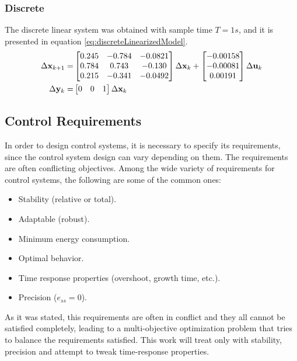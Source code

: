  \subsubsection{Discrete}
 The discrete linear system was obtained with sample time $T=1s$, and it is presented in equation \ref{eq:discreteLinearizedModel}.
 \begin{equation}\label{eq:discreteLinearizedModel}
\begin{split}
    \Delta\mathbf{x}_{k+1} =& \begin{bmatrix}
0.245 & -0.784 & -0.0821\\
0.784 &0.743 & -0.130\\
0.215 & -0.341 & -0.0492
\end{bmatrix} \Delta\mathbf{x}_k+\begin{bmatrix}
-0.00158\\
-0.00081\\
 0.00191
\end{bmatrix}\Delta\mathbf{u}_k\\\vspace{5mm}
    \Delta\mathbf{y}_k=&\begin{bmatrix}
0 & 0 & 1
\end{bmatrix}\Delta\mathbf{x}_k
\end{split}
\end{equation}
 
\subsection{Control Requirements}
In order to design control systems, it is necessary to specify its requirements, since the control system design can vary depending on them. The requirements are often conflicting objectives. Among the wide variety of requirements for control systems, the following are some of the common ones:
\begin{itemize}
    \item Stability (relative or total).
    \item Adaptable (robust).
    \item Minimum energy consumption.
    \item Optimal behavior.
    \item Time response properties (overshoot, growth time, etc.).
    \item Precision ($e_{ss}=0$).
\end{itemize}
As it was stated, this requirements are often in conflict and they all cannot be satisfied completely, leading to a multi-objective optimization problem that tries to balance the requirements satisfied. This work will treat only with stability, precision and attempt to tweak time-response properties.

